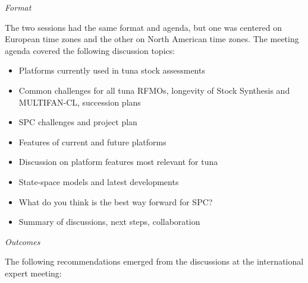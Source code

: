 \documentclass{SCreport}
\begin{document}
\textit{Format}

The two sessions had the same format and agenda, but one was centered on
European time zones and the other on North American time zones. The meeting
agenda covered the following discussion topics:

\begin{itemize}
  \item Platforms currently used in tuna stock assessments\\[-4ex]
  \item Common challenges for all tuna RFMOs, longevity of Stock Synthesis and
  MULTIFAN-CL, succession plans\\[-4ex]
  \item SPC challenges and project plan\\[-4ex]
  \item Features of current and future platforms\\[-4ex]
  \item Discussion on platform features most relevant for tuna\\[-4ex]
  \item State-space models and latest developments\\[-4ex]
  \item What do you think is the best way forward for SPC?\\[-4ex]
  \item Summary of discussions, next steps, collaboration
\end{itemize}

\textit{Outcomes}

The following recommendations emerged from the discussions at the international
expert meeting:
\end{document}
